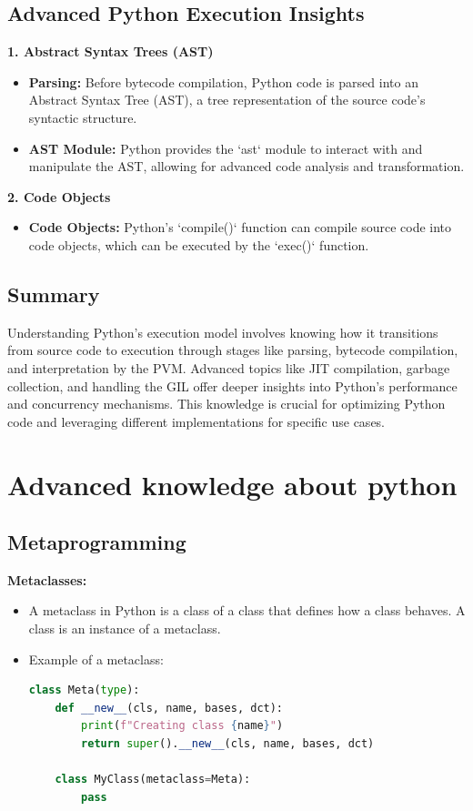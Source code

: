 \documentclass[12pt]{article}
\begin{document}
\subsection{Advanced Python Execution Insights}
\textbf{1. Abstract Syntax Trees (AST)}
\begin{itemize}
    \item \textbf{Parsing:} Before bytecode compilation, Python code is parsed into an Abstract Syntax Tree (AST), a tree representation of the source code's syntactic structure.
    \item \textbf{AST Module:} Python provides the `ast` module to interact with and manipulate the AST, allowing for advanced code analysis and transformation.
\end{itemize}


\textbf{2. Code Objects}
\begin{itemize}
    \item \textbf{Code Objects:} Python's `compile()`  function can compile source code into code objects, which can be executed by the `exec()` function.
\end{itemize}

\subsection{Summary}
Understanding Python's execution model involves knowing how it transitions from source code to execution through stages like parsing, bytecode compilation, and interpretation by the PVM. Advanced topics like JIT compilation, garbage collection, and handling the GIL offer deeper insights into Python's performance and concurrency mechanisms. This knowledge is crucial for optimizing Python code and leveraging different implementations for specific use cases.

\section{Advanced knowledge about python}

\subsection{Metaprogramming}
\textbf{Metaclasses:}
\begin{itemize}
    \item A metaclass in Python is a class of a class that defines how a class behaves. A class is an instance of a metaclass.
    \item Example of a metaclass:\\
    \begin{lstlisting}[language = Python]
    class Meta(type):
    def __new__(cls, name, bases, dct):
        print(f"Creating class {name}")
        return super().__new__(cls, name, bases, dct)
        
    class MyClass(metaclass=Meta):
        pass
    \end{lstlisting}
    
\end{itemize}
\end{document}
